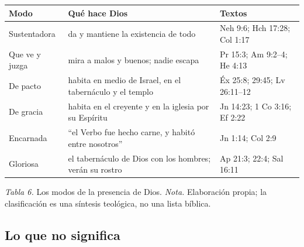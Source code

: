 \begin{center}\small\renewcommand{\arraystretch}{1.2}
\begin{tabular}{@{}L{3.2cm}L{6.0cm}L{4.8cm}@{}}
\toprule
\textbf{Modo} & \textbf{Qué hace Dios} & \textbf{Textos} \\ \midrule
Sustentadora & da y mantiene la existencia de todo & Neh 9:6; Hch 17:28; Col 1:17 \\
Que ve y juzga & mira a malos y buenos; nadie escapa & Pr 15:3; Am 9:2--4; He 4:13 \\
De pacto & habita en medio de Israel, en el tabernáculo y el templo & Éx 25:8; 29:45; Lv 26:11--12 \\
De gracia & habita en el creyente y en la iglesia por su Espíritu & Jn 14:23; 1 Co 3:16; Ef 2:22 \\
Encarnada & ``el Verbo fue hecho carne, y habitó entre nosotros'' & Jn 1:14; Col 2:9 \\
Gloriosa & el tabernáculo de Dios con los hombres; verán su rostro & Ap 21:3; 22:4; Sal 16:11 \\
\bottomrule
\end{tabular}\par
{\footnotesize\color{gris}\textit{Tabla 6.} Los modos de la presencia de Dios. \textit{Nota.} Elaboración propia; la clasificación es una síntesis teológica, no una lista bíblica.}
\end{center}

\subsection{Lo que no significa}

